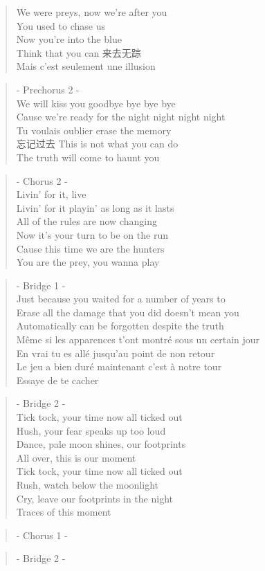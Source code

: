 \begin{verse}
We were preys, now we're after you\\
You used to chase us\\
Now you're into the blue\\
Think that you can 来去无踪 \\
Mais c'est seulement une illusion
\end{verse}

\begin{verse}
- Prechorus 2 -\\
We will kiss you goodbye bye bye bye\\
Cause we're ready for the night night night night\\
Tu voulais oublier erase the memory\\
忘记过去 This is not what you can do\\
The truth will come to haunt you
\end{verse}

\begin{verse}
- Chorus 2 -\\
Livin' for it, live \\
Livin' for it playin' as long as it lasts\\
All of the rules are now changing\\
Now it's your turn to be on the run\\
Cause this time we are the hunters \\
You are the prey, you wanna play
\end{verse}

\clearpage
{}

\begin{verse}
- Bridge 1 -\\
Just because you waited for a number of years to \\
Erase all the damage that you did doesn't mean you\\
Automatically can be forgotten despite the truth\\
Même si les apparences t'ont  montré sous un certain jour\\
En vrai tu es allé jusqu'au point de non retour \\
Le jeu a bien duré maintenant c'est à notre tour\\
Essaye de te cacher 
\end{verse}

\begin{verse}
- Bridge 2 -\\
Tick tock, your time now all ticked out\\
Hush, your fear speaks up too loud\\
Dance, pale moon shines, our footprints \\
All over, this is our moment\\ 
Tick tock, your time now all ticked out \\
Rush, watch below the moonlight \\
Cry, leave our footprints in the night \\
Traces of this moment
\end{verse}

\begin{verse}
- Chorus 1 -
\end{verse}

\begin{verse}
- Bridge 2 -
\end{verse}
\clearpage
